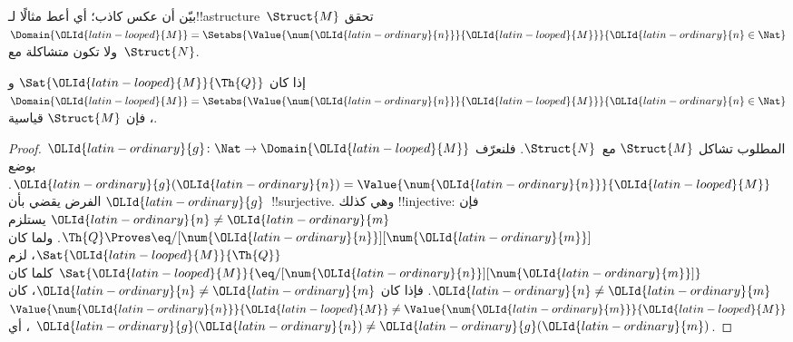 \documentclass[../../../include/open-logic-section]{subfiles}
\begin{document}
\begin{prob}
بيّن أن عكس  كاذب؛ أي أعط
مثالًا لـ!!a{structure}~$\Struct{M}$ تحقق
$\Domain{\OLId{latin-looped}{M}} = \Setabs{\Value{\num{\OLId{latin-ordinary}{n}}}{\OLId{latin-looped}{M}}}{\OLId{latin-ordinary}{n} \in \Nat}$ ولا تكون
متشاكلة مع~$\Struct{N}$.
\end{prob}

\begin{prop}
إذا كان $\Sat{\OLId{latin-looped}{M}}{\Th{Q}}$ و
$\Domain{\OLId{latin-looped}{M}} = \Setabs{\Value{\num{\OLId{latin-ordinary}{n}}}{\OLId{latin-looped}{M}}}{\OLId{latin-ordinary}{n} \in \Nat}$، فإن
$\Struct{M}$ قياسية.
\end{prop}

\begin{proof}
المطلوب تشاكل $\Struct{M}$ مع~$\Struct{N}$. فلنعرّف
$\OLId{latin-ordinary}{g}\colon \Nat \to \Domain{\OLId{latin-looped}{M}}$ بوضع
$\OLId{latin-ordinary}{g}(\OLId{latin-ordinary}{n})=\Value{\num{\OLId{latin-ordinary}{n}}}{\OLId{latin-looped}{M}}$. الفرض يقضي بأن $\OLId{latin-ordinary}{g}$~!!{surjective}.
وهي كذلك !!{injective}: فإن $\OLId{latin-ordinary}{n} \neq \OLId{latin-ordinary}{m}$ يستلزم
$\Th{Q} \Proves \eq/[\num{\OLId{latin-ordinary}{n}}][\num{\OLId{latin-ordinary}{m}}]$. ولما كان
$\Sat{\OLId{latin-looped}{M}}{\Th{Q}}$، لزم $\Sat{\OLId{latin-looped}{M}}{\eq/[\num{\OLId{latin-ordinary}{n}}][\num{\OLId{latin-ordinary}{m}}]}$
كلما كان $\OLId{latin-ordinary}{n} \neq \OLId{latin-ordinary}{m}$. فإذا كان $\OLId{latin-ordinary}{n} \neq \OLId{latin-ordinary}{m}$، كان
$\Value{\num{\OLId{latin-ordinary}{n}}}{\OLId{latin-looped}{M}} \neq \Value{\num{\OLId{latin-ordinary}{m}}}{\OLId{latin-looped}{M}}$، أي $\OLId{latin-ordinary}{g}(\OLId{latin-ordinary}{n}) \neq \OLId{latin-ordinary}{g}(\OLId{latin-ordinary}{m})$.


\end{proof}
\end{document}
